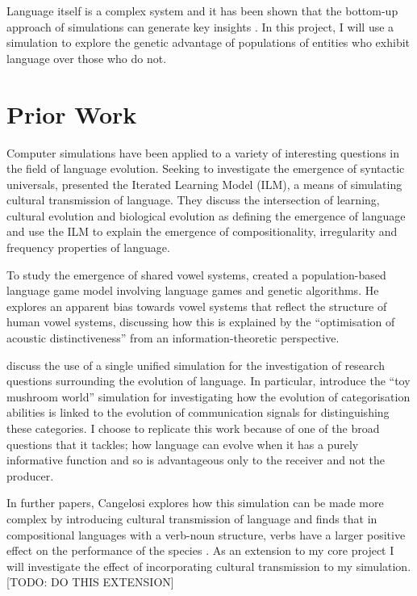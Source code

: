 \documentclass[12pt,a4paper,twoside,openright]{report}
\begin{document}
Language itself is a complex system and it has been shown that the bottom-up approach of simulations can generate key insights \citep{langton1997artificial}. In this project, I will use a simulation to explore the genetic advantage of populations of entities who exhibit language over those who do not.

\section{Prior Work}

Computer simulations have been applied to a variety of interesting questions in the field of language evolution. Seeking to investigate the emergence of syntactic universals, \citet{kirby2002emergence} presented the Iterated Learning Model (ILM), a means of simulating cultural transmission of language. They discuss the intersection of learning, cultural evolution and biological evolution as defining the emergence of language and use the ILM to explain the emergence of compositionality, irregularity and frequency properties of language.

To study the emergence of shared vowel systems, \citet{de1997generating} created a population-based language game model involving language games and genetic algorithms. He explores an apparent bias towards vowel systems that reflect the structure of human vowel systems, discussing how this is explained by the ``optimisation of acoustic distinctiveness'' from an information-theoretic perspective.

\citet{parisi2002unified} discuss the use of a single unified simulation for the investigation of research questions surrounding the evolution of language. In particular, \citet{Cangelosi1998} introduce the ``toy mushroom world'' simulation for investigating how the evolution of categorisation abilities is linked to the evolution of communication signals for distinguishing these categories. I choose to replicate this work because of one of the broad questions that it tackles; how language can evolve when it has a purely informative function and so is  advantageous only to the receiver and not the producer. 

In further papers, Cangelosi explores how this simulation can be made more complex by introducing cultural transmission of language and finds that in compositional languages with a verb-noun structure, verbs have a larger positive effect on the performance of the species \citep{cangelosi2001evolution}. As an extension to my core project I will investigate the effect of incorporating cultural transmission to my simulation. [TODO: DO THIS EXTENSION]
\end{document}
